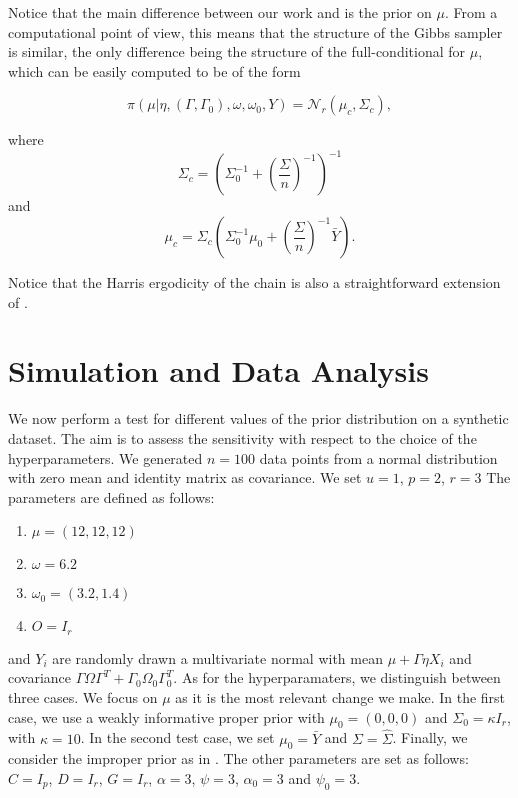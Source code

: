 \documentclass[graybox]{svmult}
\begin{document}
Notice that the main difference between our work and
\cite{khareBayesianApproachEnvelope2017} is the prior on $\mu$. From a
computational point of view, this means that the structure of the
Gibbs sampler is similar, the only difference being the structure of
the full-conditional for $\mu$, which can be easily computed to be of
the form

\begin{equation}
  \label{eq:6}
  \pi \left( \mu | \eta, \left( \Gamma, \Gamma_0 \right), \omega, \omega_0, Y \right) = \mathcal{N}_r\left( \mu_{c}, \Sigma_{c} \right),
\end{equation}

where $$\Sigma_{c} = \left( \Sigma^{-1}_0 + \left(\frac{\Sigma}{n} \right)^{-1}\right)^{-1}$$ and $$\mu_{c} = \Sigma_{c} \left( \Sigma_0^{-1} \mu_0 + \left(\frac{\Sigma}{n} \right)^{-1} \bar{Y} \right).$$

Notice that the Harris ergodicity of the chain is also a
straightforward extension of \cite{khareBayesianApproachEnvelope2017}.

\section{Simulation and Data Analysis}
We now perform a test for different values of the prior distribution
on a synthetic dataset. The aim is to assess the sensitivity with
respect to the choice of the hyperparameters. We generated $n = 100$
data points from a normal distribution with zero mean and identity
matrix as covariance. We set $u = 1$, $p = 2$, $r = 3$ The parameters
are defined as follows:

\begin{enumerate}
\item $\mu = \left( 12, 12, 12 \right)$
\item $\omega = 6.2$
\item $\omega_0 = \left( 3.2, 1.4 \right)$
\item $O = I_r$
\end{enumerate}

and $Y_i$ are randomly drawn a multivariate normal with mean
$\mu + \Gamma \eta X_i$ and covariance
$\Gamma \Omega \Gamma^T + \Gamma_0 \Omega_0 \Gamma_{0}^T$.  As for the
hyperparamaters, we distinguish between three cases. We focus on $\mu$
as it is the most relevant change we make. In the first case, we use a
weakly informative proper prior with $\mu_0 = \left( 0, 0, 0 \right)$
and $\Sigma_0 = \kappa I_r$, with $\kappa = 10$. In the second test
case, we set $\mu_0 = \bar{Y}$ and $\Sigma = \hat{\Sigma}$. Finally,
we consider the improper prior as in
\cite{khareBayesianApproachEnvelope2017}. The other parameters are set
as follows: $C = I_p$, $D = I_r$, $G = I_r$, $\alpha = 3$, $\psi = 3$, $\alpha_0 = 3$ and $\psi_0 = 3$.
\end{document}

